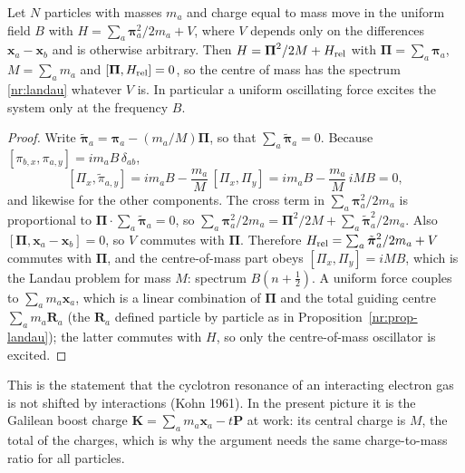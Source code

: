 \begin{nrprop}\label{nr:prop-kohn}
Let $N$ particles with masses $m_a$ and charge equal to mass move in the uniform field $B$ with
$H=\sum_a\boldsymbol\pi_a^2/2m_a+V$, where $V$ depends only on the differences
$\mathbf{x}_a-\mathbf{x}_b$ and is otherwise arbitrary. Then
$H=\boldsymbol\Pi^2/2M+H_{\rm rel}$ with $\boldsymbol\Pi=\sum_a\boldsymbol\pi_a$,
$M=\sum_am_a$ and $[\boldsymbol\Pi,H_{\rm rel}]=0$, so the centre of mass has the
spectrum \eqref{nr:landau} whatever $V$ is. In particular a uniform
oscillating force excites the system only at the frequency $B$.
\end{nrprop}
\begin{proof}
Write $\tilde{\boldsymbol\pi}_a=\boldsymbol\pi_a-(m_a/M)\boldsymbol\Pi$, so that
$\sum_a\tilde{\boldsymbol\pi}_a=0$. Because $[\pi_{b,x},\pi_{a,y}]=im_aB\,\delta_{ab}$,
\[
  [\Pi_x,\tilde\pi_{a,y}]=im_aB-\frac{m_a}{M}\,[\Pi_x,\Pi_y]
  =im_aB-\frac{m_a}{M}\,iMB=0 ,
\]
and likewise for the other components. The cross term in
$\sum_a\boldsymbol\pi_a^2/2m_a$ is proportional to $\boldsymbol\Pi\cdot\sum_a\tilde{\boldsymbol\pi}_a=0$, so
$\sum_a\boldsymbol\pi_a^2/2m_a=\boldsymbol\Pi^2/2M+\sum_a\tilde{\boldsymbol\pi}_a^2/2m_a$.
Also $[\boldsymbol\Pi,\mathbf{x}_a-\mathbf{x}_b]=0$, so $V$ commutes with $\boldsymbol\Pi$. Therefore
$H_{\rm rel}=\sum_a\tilde{\boldsymbol\pi}_a^2/2m_a+V$ commutes with $\boldsymbol\Pi$, and
the centre-of-mass part obeys $[\Pi_x,\Pi_y]=iMB$, which is the Landau problem for mass $M$:
spectrum $B(n+\tfrac12)$. A uniform force couples to
$\sum_am_a\mathbf{x}_a$, which is a linear combination of $\boldsymbol\Pi$ and the
total guiding centre $\sum_am_a\mathbf{R}_a$ (the $\mathbf{R}_a$ defined particle by
particle as in Proposition~\ref{nr:prop-landau}); the latter commutes with $H$,
so only the centre-of-mass oscillator is excited.
\end{proof}

This is the statement that the cyclotron resonance of an interacting electron
gas is not shifted by interactions (Kohn 1961). In the present picture it is
the Galilean boost charge $\mathbf{K}=\sum_am_a\mathbf{x}_a-t\mathbf{P}$ at work:
its central charge is $M$, the total of the charges, which is why the argument
needs the same charge-to-mass ratio for all particles.


